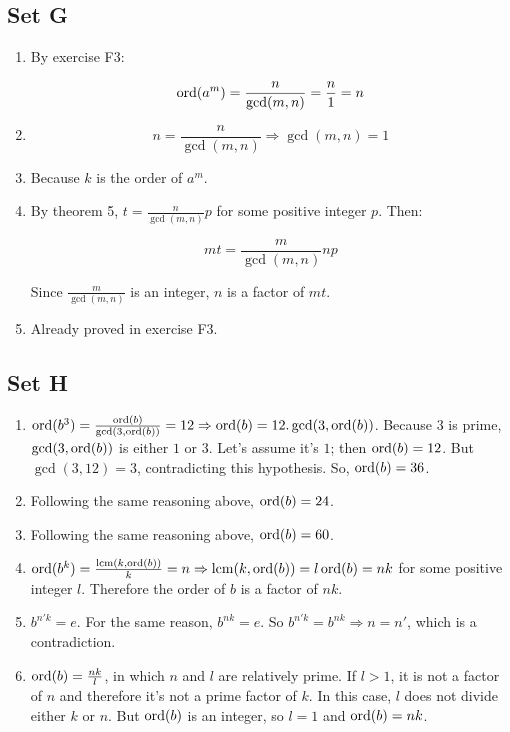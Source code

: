 \subsection{Set G}
\begin{enumerate}
    \item By exercise F3:

    $$ \operatorname{ord}(a^m) = \frac{n}{\gcd(m, n)} = \frac{n}{1} = n$$

    \item $$ n = \frac{n}{\gcd(m, n)} \Rightarrow \gcd(m, n) = 1$$

    \item Because $ k $ is the order of $ a^m $.

    \item By theorem 5, $ t = \frac{n}{\gcd(m, n)}p $ for some positive integer $ p $. Then:

    $$ mt = \frac{m}{\gcd(m, n)}np $$ 

    Since $ \frac{m}{\gcd(m, n)} $ is an integer, $ n $ is a factor of $ mt $.

    \item Already proved in exercise F3.
\end{enumerate}

\subsection{Set H}
\begin{enumerate}
    \item $ \operatorname{ord}(b^3) = \frac{\operatorname{ord}(b)}{\gcd(3, \operatorname{ord}(b))} = 12 \Rightarrow \operatorname{ord}(b) = 12.\gcd(3, \operatorname{ord}(b)) $. Because $ 3 $ is prime, $ \gcd(3, \operatorname{ord}(b)) $ is either $ 1 $ or $ 3 $. Let's assume it's $ 1 $; then $ \operatorname{ord}(b) = 12 $. But $ \gcd(3, 12) = 3 $, contradicting this hypothesis. So, $ \operatorname{ord}(b) = 36 $.

    \item Following the same reasoning above, $ \operatorname{ord}(b) = 24 $.

    \item Following the same reasoning above, $ \operatorname{ord}(b) = 60 $.

    \item $ \operatorname{ord}(b^k) = \frac{\operatorname{lcm}(k, \operatorname{ord}(b))}{k} = n \Rightarrow \operatorname{lcm}(k, \operatorname{ord}(b)) = l\operatorname{ord}(b) = nk $ for some positive integer $ l $. Therefore the order of $ b $ is a factor of $ nk $.

    \item $ b^{n'k}  = e$. For the same reason, $ b^{nk} = e $. So $ b^{n'k} = b^{nk} \Rightarrow n = n' $, which is a contradiction.

    \item $ \operatorname{ord}(b) = \frac{nk}{l} $, in which $ n $ and $ l $ are relatively prime. If $ l > 1 $, it is not a factor of $ n $ and therefore it's not a prime factor of $ k $. In this case, $ l $ does not divide either $ k $ or $ n $. But $ \operatorname{ord}(b) $ is an integer, so $ l = 1 $ and $ \operatorname{ord}(b) = nk $.
\end{enumerate}
